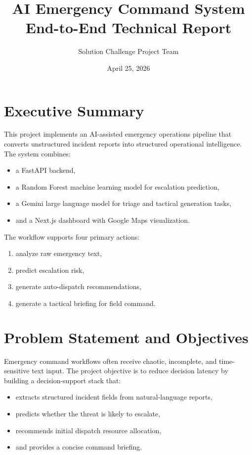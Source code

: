\documentclass[12pt,a4paper]{article}
\title{\textbf{AI Emergency Command System}\\\large End-to-End Technical Report}
\author{Solution Challenge Project Team}
\date{April 25, 2026}
\begin{document}
\maketitle
\tableofcontents
\newpage

\section{Executive Summary}
This project implements an AI-assisted emergency operations pipeline that converts unstructured incident reports into structured operational intelligence. The system combines:
\begin{itemize}[leftmargin=1.5em]
  \item a FastAPI backend,
  \item a Random Forest machine learning model for escalation prediction,
  \item a Gemini large language model for triage and tactical generation tasks,
  \item and a Next.js dashboard with Google Maps visualization.
\end{itemize}

The workflow supports four primary actions:
\begin{enumerate}[leftmargin=1.5em]
  \item analyze raw emergency text,
  \item predict escalation risk,
  \item generate auto-dispatch recommendations,
  \item generate a tactical briefing for field command.
\end{enumerate}

\section{Problem Statement and Objectives}
Emergency command workflows often receive chaotic, incomplete, and time-sensitive text input. The project objective is to reduce decision latency by building a decision-support stack that:
\begin{itemize}[leftmargin=1.5em]
  \item extracts structured incident fields from natural-language reports,
  \item predicts whether the threat is likely to escalate,
  \item recommends initial dispatch resource allocation,
  \item and provides a concise command briefing.
\end{itemize}
\end{document}
